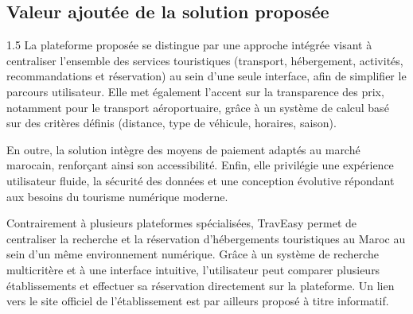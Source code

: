 \documentclass[a4paper,12pt]{report}
\begin{document}
\subsection{Valeur ajoutée de la solution proposée}
\vspace{0.5cm}
\begin{spacing}{1.5}
\justifying
La plateforme proposée se distingue par une approche intégrée visant à centraliser l'ensemble des services touristiques (transport, hébergement, activités, recommandations et réservation) au sein d'une seule interface, afin de simplifier le parcours utilisateur. Elle met également l'accent sur la transparence des prix, notamment pour le transport aéroportuaire, grâce à un système de calcul basé sur des critères définis (distance, type de véhicule, horaires, saison).

En outre, la solution intègre des moyens de paiement adaptés au marché marocain, renforçant ainsi son accessibilité. Enfin, elle privilégie une expérience utilisateur fluide, la sécurité des données et une conception évolutive répondant aux besoins du tourisme numérique moderne.

Contrairement à plusieurs plateformes spécialisées, TravEasy permet de centraliser la recherche et la réservation d'hébergements touristiques au Maroc au sein d'un même environnement numérique. Grâce à un système de recherche multicritère et à une interface intuitive,  l'utilisateur peut comparer plusieurs établissements et effectuer sa réservation directement sur la plateforme. Un lien vers le site officiel de l'établissement est par ailleurs proposé à titre informatif.


\end{spacing}
\end{document}
